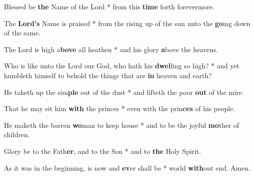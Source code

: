 \begin{multicols}{2}
	Blessed be \textbf{the} Name of the Lord * from this \textbf{time} forth forevermore.
	
	The \textbf{Lord's} Name is praised * from the rising up of the sun unto the \textbf{go}ing down of the same.
	
	The Lord is high a\textbf{bove} all heathen * and his glory \textbf{a}bove the heavens.
	
	Who is like unto the Lord our God, who hath his \textbf{dwel}ling so high? * and yet humbleth himself to behold the things that are \textbf{in} heaven and earth?
	
	He taketh up the sim\textbf{ple} out of the dust * and lifteth the poor \textbf{out} of the mire.
	
	That he may sit him \textbf{with} the princes * even with the prin\textbf{ces} of his people.
	
	He maketh the barren \textbf{wo}man to keep house * and to be the joyful \textbf{mo}ther of children.
	
	Glory be to the Fath\textbf{er}, and to the Son * and to \textbf{the} Holy Spirit.
	
	As it was in the beginning, is now and \textbf{ev}er shall be * world \textbf{with}out end. Amen.
\end{multicols}